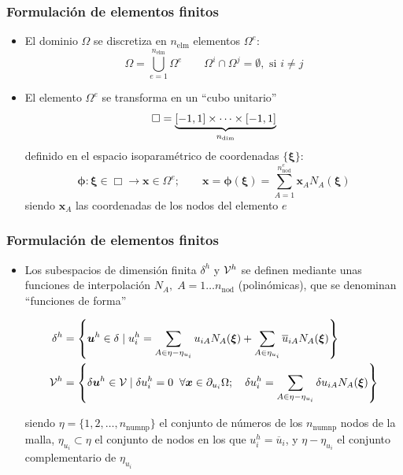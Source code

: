 \documentclass[10pt, aspectratio=43]{beamer}
\begin{document}
\begin{frame}
\frametitle{Formulación de elementos finitos}
\begin{itemize}
\item El dominio $\Omega$ se discretiza en $n_{\textrm{elm}}$ elementos
$\Omega^e$:
\begin{equation}
\Omega=\bigcup_{e=1}^{n_{\textrm{elm}}} \Omega^e \qquad \Omega^i \cap \Omega^j=
\emptyset,\textrm{ si } i\neq j
\end{equation}
\item El elemento $\Omega^e$ se transforma
en un ``cubo unitario''
$$\Box=\underbrace{[-1,1]\times \cdots \times [-1,1]}_{n_{\rm dim}}$$
definido en el espacio isoparamétrico de coordenadas $\{ \bm{\xi} \}$:
\begin{equation}
\bm{\phi}:\bm{\xi}\in \Box \rightarrow \bm{x} \in \Omega^e; \qquad
\bm{x}=\bm{\phi}(\bm{\xi})=\sum_{A=1}^{n^{e}_{\textrm{nod}}}
\bm{x}_{A} N_{A}(\bm{\xi}) \label{mapiso}
\end{equation}
siendo $\bm{x}_A$ las coordenadas de los nodos
del elemento $e$
\end{itemize}
\end{frame}
\begin{frame}
\frametitle{Formulación de elementos finitos}
\begin{itemize}
\item Los subespacios de dimensión finita $\delta^h$ y ${\cal V}^h$
se definen mediante unas funciones de interpolación $N_A, \;
A=1 \ldots n_{\textrm{nod}}$ (polinómicas), que se denominan ``funciones de forma''
\begin{small}
\begin{align*}
\delta^h&=\left\{
\bm{u}^{h} \in \delta \mid
u_i^{h}=\sum_{A\in \eta - \eta_{u_i}} u_{iA}N_{A}(\bm{\xi})+
\sum_{A \in \eta_{u_i}} \overline{u}_{iA}N_{A}(\bm{\xi})
\right\}  \\
{\cal V}^{h}&=\left\{
\delta \bm{u}^{h} \in {\cal V} \mid \delta u_i^{h}=0 \;\;
\forall \bm{x} \in \partial_{u_i} \Omega ; \quad
\delta u_i^{h}=\sum_{A\in \eta - \eta_{u_i}}
\delta u_{iA}N_{A}(\bm{\xi})
\right\}
\end{align*}
\end{small}
siendo $\eta=\{ 1,2,\ldots,n_{\textrm{numnp}} \}$ el conjunto de números de los
$n_{\textrm{numnp}}$ nodos de la malla, $\eta_{u_i} \subset \eta$ el conjunto
de nodos en los que $u_i^h=\overline{u}_i$, y $\eta - \eta_{u_i}$ el conjunto
complementario de $\eta_{u_i}$
\end{itemize}
\end{frame}
\end{document}
